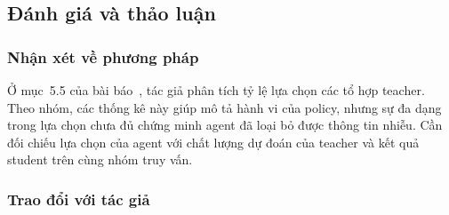 \subsection{Đánh giá và thảo luận}
\label{sec:dsom_discussion}

\subsubsection{Nhận xét về phương pháp}

Ở mục~5.5 của bài báo~\cite{10.1145/3746027.3754576}, tác giả
phân tích tỷ lệ lựa chọn các tổ hợp teacher. Theo nhóm, các
thống kê này giúp mô tả hành vi của policy, nhưng sự đa dạng
trong lựa chọn chưa đủ chứng minh agent đã loại bỏ được thông
tin nhiễu. Cần đối chiếu lựa chọn của agent với chất lượng dự
đoán của teacher và kết quả student trên cùng nhóm truy vấn.

\subsubsection{Trao đổi với tác giả}
\label{sec:dsom_author_correspondence}

